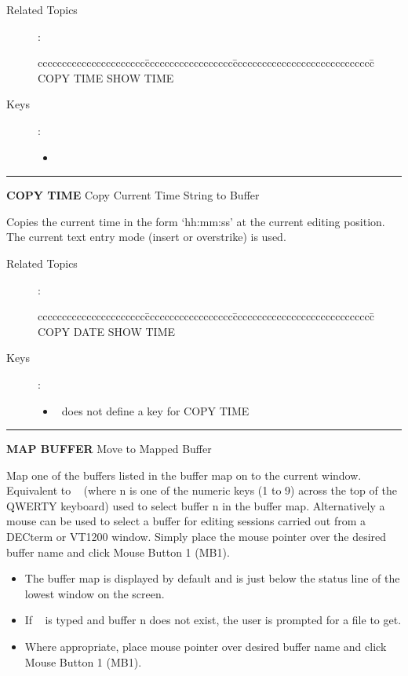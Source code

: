 \begin{description}
\item[Related Topics]:
\begin{tabbing}
cccccccccccccccccccccc\=cccccccccccccccccc\=ccccccccccccccccccccccccccccc\=\kill
COPY TIME \> SHOW TIME  \\
\end{tabbing}

\item[Keys]:
           \begin{itemize}
           \item \gold\ 
           \end{itemize}
\end{description}

\goodbreak

\rule{\textwidth}{0.3mm}

{\Large {\bf COPY TIME} \hfill Copy Current Time String to Buffer}

\medskip
  Copies the current time in the form `hh:mm:ss' at the current editing
  position. The current text entry mode (insert or overstrike) is used.

\begin{description}
\item[Related Topics]:
\begin{tabbing}
cccccccccccccccccccccc\=cccccccccccccccccc\=ccccccccccccccccccccccccccccc\=\kill
COPY DATE \> SHOW TIME \\
\end{tabbing}

\item[Keys]:
          \begin{itemize}
          \item \STEve\ does not define a key for COPY TIME
          \end{itemize}
\end{description}
\goodbreak

\rule{\textwidth}{0.3mm}

{\Large {\bf MAP BUFFER} \hfill Move to Mapped Buffer}

\medskip
  Map one of the buffers listed in the buffer map on to the current
  window. Equivalent to \gold\  (where n is one of the numeric
  keys (1 to 9) across the top of the QWERTY keyboard) used to select buffer n
  in the buffer map. Alternatively a mouse can be used to select a buffer for
  editing sessions carried out from a DECterm or VT1200 window. Simply place
  the mouse pointer over the desired buffer name and click Mouse Button 1
  (MB1).
  \begin{itemize}
  \item The buffer map is displayed by default and is just below the status
        line of the lowest window on the screen.
  \item If \gold\  is typed and buffer n does not exist, the user
        is prompted for a file to get.
  \item Where appropriate, place mouse pointer over desired buffer name and
        click Mouse Button 1 (MB1).
  \end{itemize}

